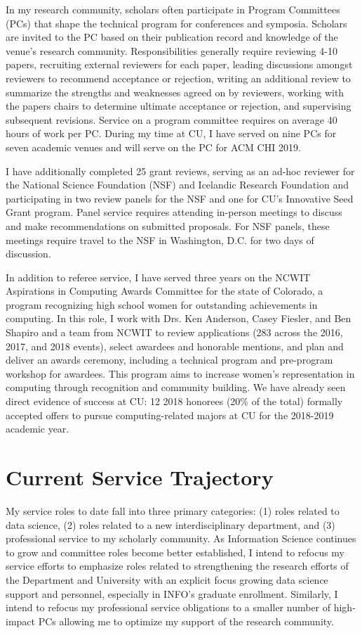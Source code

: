 \documentclass[11pt]{article}
\begin{document}
In my research community, scholars often participate in Program Committees (PCs) that shape the technical program for conferences and symposia. Scholars are invited to the PC based on their publication record and knowledge of the venue's research community. Responsibilities generally require reviewing 4-10 papers, recruiting external reviewers for each paper, leading discussions amongst reviewers to recommend acceptance or rejection, writing an additional review to summarize the strengths and weaknesses agreed on by reviewers, working with the papers chairs to determine ultimate acceptance or rejection, and supervising subsequent revisions. Service on a program committee requires on average 40 hours of work per PC. During my time at CU, I have served on nine PCs for seven academic venues and will serve on the PC for ACM CHI 2019. 

I have additionally completed 25 grant reviews, serving as an ad-hoc reviewer for the National Science Foundation (NSF) and Icelandic Research Foundation and participating in two review panels for the NSF and one for CU's Innovative Seed Grant program. Panel service requires attending in-person meetings to discuss and make recommendations on submitted proposals. For NSF panels, these meetings require travel to the NSF in Washington, D.C. for two days of discussion. 

In addition to referee service, I have served three years on the NCWIT Aspirations in Computing Awards Committee for the state of Colorado, a program recognizing high school women for outstanding achievements in computing. In this role, I work with Drs. Ken Anderson, Casey Fiesler, and Ben Shapiro and a team from NCWIT to review applications (283 across the 2016, 2017, and 2018 events), select awardees and honorable mentions, and plan and deliver an awards ceremony, including a technical program and pre-program workshop for awardees. This program aims to increase women's representation in computing through recognition and community building. We have already seen direct evidence of success at CU: 12 2018 honorees (20\% of the total) formally accepted offers to pursue computing-related majors at CU for the 2018-2019 academic year.

\section*{Current Service Trajectory}
My service roles to date fall into three primary categories: (1) roles related to data science, (2) roles related to a new interdisciplinary department, and (3) professional service to my scholarly community. As Information Science continues to grow and committee roles become better established, I intend to refocus my service efforts to emphasize roles related to strengthening the research efforts of the Department and University with an explicit focus growing data science support and personnel, especially in INFO's graduate enrollment. Similarly, I intend to refocus my professional service obligations to a smaller number of high-impact PCs allowing me to optimize my support of the research community. 

\pagebreak
\setcounter{page}{1}
\end{document}
